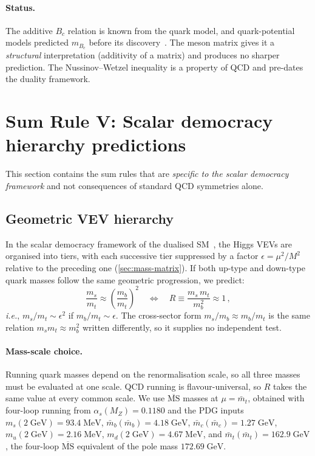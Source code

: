 \documentclass[11pt,a4paper]{article}
\newcommand{\ie}{\textit{i.e.}}
\theoremstyle{plain}
\begin{document}
\paragraph{Status.} The additive $B_c$ relation is known from the
quark model, and quark-potential models predicted $m_{B_c}$ before its
discovery~\cite{EichtenQuigg1994}.  The meson matrix gives it a
\emph{structural} interpretation (additivity of a matrix) and produces
no sharper prediction.  The Nussinov--Wetzel inequality is a property
of QCD and pre-dates the duality framework.


\section{Sum Rule V: Scalar democracy hierarchy predictions}
\label{sec:scalar-dem-test}

This section contains the sum rules that are \emph{specific to the
scalar democracy framework} and not consequences of standard QCD
symmetries alone.

\subsection{Geometric VEV hierarchy}

In the scalar democracy framework of the dualised
SM~\cite{CacciapagliaSannino2024,HillMachado2019}, the Higgs VEVs are
organised into tiers, with each successive tier suppressed by a factor
$\epsilon = \mu^2/M^2$ relative to the preceding one (\cref{sec:mass-matrix}).
If both up-type and down-type quark masses follow the same geometric
progression, we predict:
\begin{equation}\label{eq:geometric-sr}
  \boxed{\frac{m_s}{m_t} \approx \left(\frac{m_b}{m_t}\right)^2
  \quad\Longleftrightarrow\quad
  R \equiv \frac{m_s\, m_t}{m_b^2} \approx 1\,,}
\end{equation}
\ie, $m_s/m_t \sim \epsilon^2$ if $m_b/m_t \sim \epsilon$.  The
cross-sector form $m_s/m_b \approx m_b/m_t$ is the same relation
$m_s m_t \approx m_b^2$ written differently, so it supplies no
independent test.

\paragraph{Mass-scale choice.}  Running quark masses depend on the
renormalisation scale, so all three masses must be evaluated at one
scale.  QCD running is flavour-universal, so $R$ takes the same value
at every common scale.  We use $\overline{\text{MS}}$ masses at
$\mu = \bar{m}_t$, obtained with four-loop running from
$\alpha_s(M_Z) = 0.1180$ and the PDG inputs
$m_s(2\;\text{GeV}) = 93.4\;\text{MeV}$,
$\bar{m}_b(\bar{m}_b) = 4.18\;\text{GeV}$,
$\bar{m}_c(\bar{m}_c) = 1.27\;\text{GeV}$,
$m_u(2\;\text{GeV}) = 2.16\;\text{MeV}$,
$m_d(2\;\text{GeV}) = 4.67\;\text{MeV}$, and
$\bar{m}_t(\bar{m}_t) = 162.9\;\text{GeV}$, the four-loop
$\overline{\text{MS}}$ equivalent of the pole mass
$172.69\;\text{GeV}$.
\end{document}
